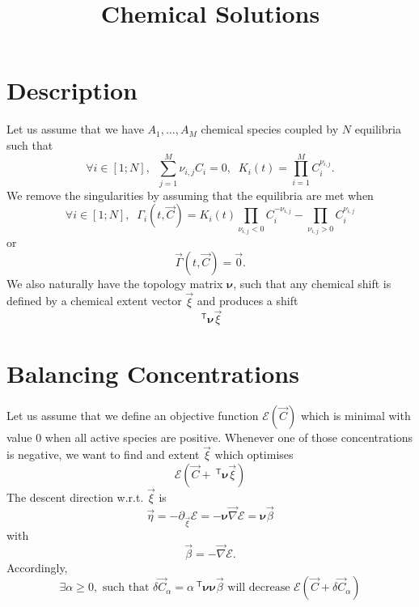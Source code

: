 \documentclass[aps]{revtex4}
\newcommand{\mymat}[1]{\bm{#1}}
\newcommand{\mytrn}[1]{~^{\mathsf{T}}{#1}}
\newcommand{\mygrad}{\vec{\nabla}}
\begin{document}
\title{Chemical Solutions}

\section{Description}
Let us assume that we have $A_1,\ldots,A_M$ chemical species coupled by
$N$ equilibria such that
\begin{equation}
	\forall i \in [1;N], \;\; \sum_{j=1}^{M} \nu_{i,j} C_i = 0, \;\; K_i(t) = \prod_{i=1}^{M} C_i^{\nu_{i,j}}.
\end{equation}
We remove the singularities by assuming that the equilibria are met when
\begin{equation}
	\forall i \in [1;N], \;\; \Gamma_i(t,\vec{C}) = K_i(t) \prod_{\nu_{i,j}<0}  C_i^{-\nu_{i,j}} -  \prod_{\nu_{i,j}>0} C_i^{\nu_{i,j}} 
\end{equation}
or
\begin{equation}
	\vec{\Gamma}(t,\vec{C}) = \vec{0}.
\end{equation}
We also naturally have the topology matrix $\mymat{\nu}$, such that
any chemical shift is defined by a  chemical extent vector $\vec{\xi}$ and
produces a shift
$$
	\mytrn{\mymat{\nu}}\vec{\xi}
$$

\section{Balancing Concentrations}


Let us assume that we define an objective function $\mathcal{E}\left(\vec{C}\right)$ which is minimal with value 0 when all active species are positive. Whenever one of those concentrations is negative, we want to find and extent $\vec{\xi}$ which optimises 
\begin{equation}
	\mathcal{E}\left(\vec{C}+\mytrn{\mymat{\nu}}\vec{\xi}\right)
\end{equation}
The descent direction w.r.t. $\vec{\xi}$ is
\begin{equation}
	\vec{\eta} = -\partial_{\vec{\xi}} \mathcal{E} = -\mymat{\nu} \mygrad \mathcal{E} = \mymat{\nu} \vec{\beta}
\end{equation}
with
\begin{equation}
	\vec{\beta} = -\mygrad \mathcal{E}.
\end{equation}
Accordingly, 
\begin{equation}
\exists \alpha \geq 0,\text{ such that }\delta\vec{C}_\alpha = \alpha \mytrn{\mymat{\nu}} \mymat{\nu} \vec{\beta} \text{ will decrease } \mathcal{E}\left( \vec{C}+\delta\vec{C}_\alpha \right)
\end{equation}
\end{document}
